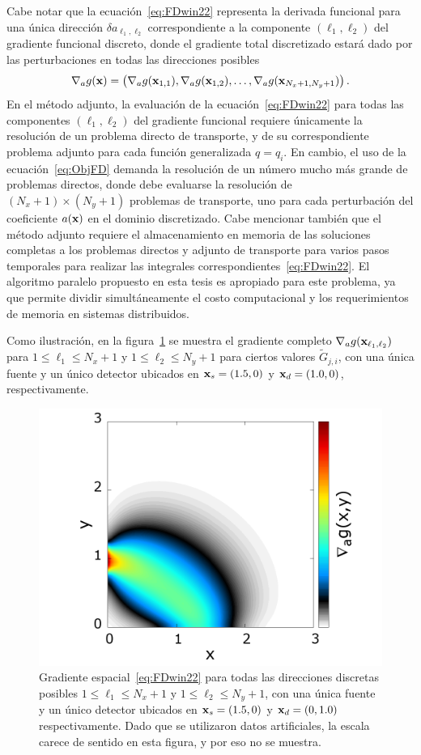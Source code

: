 Cabe notar que la ecuación~\eqref{eq:FDwin22} representa 
la derivada funcional para una única dirección $\delta a_{\ell_1,\ell_2}$ 
correspondiente a la componente $(\ell_1,\ell_2)$ del gradiente funcional discreto, 
donde el gradiente total discretizado estará dado por las perturbaciones en todas las direcciones posibles
\begin{equation}
\nabla_a g(\mathbf{x})  = \left( \nabla_a g(\mathbf{x}_{1,1}), \nabla_a g(\mathbf{x}_{1,2}), \ldots, \nabla_a g(\mathbf{x}_{N_x+1,N_y+1})   \right).
\label{eq:grad_total}
\end{equation}
En el método adjunto, la evaluación de la ecuación~\eqref{eq:FDwin22} 
para todas las componentes $(\ell_1,\ell_2)$ del gradiente funcional requiere 
únicamente la resolución de un problema directo de transporte, y de 
su correspondiente problema adjunto para cada función generalizada $q=q_i$. 
En cambio, el uso de la ecuación~\eqref{eq:ObjFD} demanda la resolución de 
un número mucho más grande de problemas directos, donde debe evaluarse 
la resolución de $(N_x+1)\times (N_y+1)$ problemas de transporte, uno 
para cada perturbación del coeficiente $a(\mathbf{x})$ en el dominio discretizado. 
Cabe mencionar también que el método adjunto requiere el almacenamiento 
en memoria de las soluciones completas a los problemas directos y adjunto de transporte 
para varios pasos temporales para realizar las integrales correspondientes~\eqref{eq:FDwin22}. 
El algoritmo paralelo propuesto en esta tesis es apropiado para este problema, ya que permite 
dividir simultáneamente el costo computacional y los requerimientos de memoria 
en sistemas distribuidos.
 
Como ilustración, en la figura~\ref{fig:gradient} se muestra 
el gradiente completo $\nabla_a g(\mathbf{x}_{\ell_1,\ell_2})$ para 
$1\leq \ell_1\leq N_x+1$ y $1\leq \ell_2\leq N_y+1$ 
para ciertos valores $\tilde G_{j,i}$, con una única fuente y 
un único detector ubicados en $\mathbf{x}_s=(1.5,0)$ y $\mathbf{x}_d=(1.0,0)$, 
respectivamente.

\begin{figure}[h!]
\centering
  \includegraphics[width=0.5\linewidth]{figuras/gradient.png}
  \caption{
  Gradiente espacial~\eqref{eq:FDwin22} para todas 
  las direcciones discretas posibles $1\leq \ell_1\leq N_x+1$ y $1\leq \ell_2\leq N_y+1$, 
  con una única fuente y un único detector ubicados en $\mathbf{x}_s=(1.5,0)$ 
  y $\mathbf{x}_d=(0,1.0)$ respectivamente. Dado que se utilizaron 
  datos artificiales, la escala carece de sentido en esta figura, 
  y por eso no se muestra.}
 \label{fig:gradient}
\end{figure} 
 
